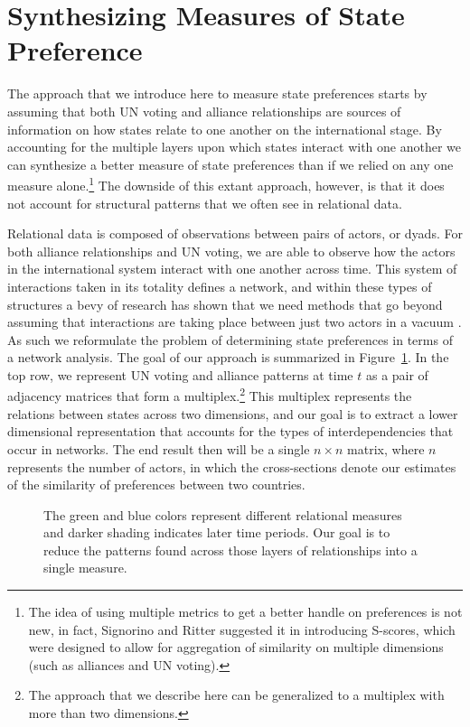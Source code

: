 \section*{Synthesizing Measures of State Preference}

The approach that we introduce here to measure state preferences starts by assuming that both UN voting and alliance relationships are sources of information on how states relate to one another on the international stage. By accounting for the multiple layers upon which states interact with one another we can synthesize a better measure of state preferences than if we relied on any one measure alone.\footnote{The idea of using multiple metrics to get a better handle on preferences is not new, in fact, Signorino and Ritter suggested it in introducing S-scores, which were designed to allow for aggregation of similarity on multiple dimensions (such as alliances and UN voting).} The downside of this extant approach, however, is that it does not account for structural patterns that we often see in relational data. 

Relational data is composed of observations between pairs of actors, or dyads. For both alliance relationships and UN voting, we are able to observe how the actors in the international system interact with one another across time. This system of interactions taken in its totality defines a network, and within these types of structures a bevy of research has shown that we need methods that go beyond assuming that interactions are taking place between just two actors in a vacuum \citep{wasserman:faust:1994,snijders:nowicki:1997}. As such we reformulate the problem of determining state preferences in terms of a network analysis. The goal of our approach is summarized in Figure~\ref{fig:tensViz}. In the top row, we represent UN voting and alliance patterns at time $t$ as a pair of adjacency matrices that form a multiplex.\footnote{The approach that we describe here can be generalized to a multiplex with more than two dimensions.} This multiplex represents the relations between states across two dimensions, and our goal is to extract a lower dimensional representation that accounts for the types of interdependencies that occur in networks. The end result then will be a single $n \times n$ matrix, where $n$ represents the number of actors, in which the cross-sections denote our estimates of the similarity of preferences between two countries.

\begin{figure}[ht]
	\centering
	\resizebox{.8\textwidth}{!}{}
	\caption{The green and blue colors represent different relational measures and darker shading indicates later time periods. Our goal is to reduce the patterns found across those layers of relationships into a single measure.}
	\label{fig:tensViz}
\end{figure}

